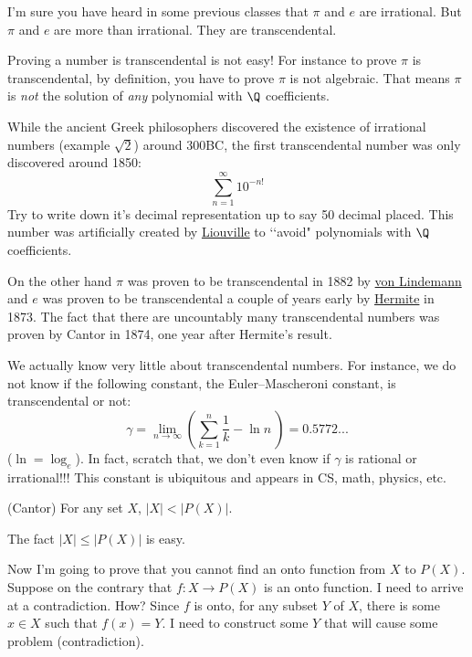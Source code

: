 I'm sure you have heard in some previous classes that $\pi$ and $e$
are irrational.
But $\pi$ and $e$ are more than irrational.
They are transcendental.

Proving a number is transcendental is not easy!
For instance to prove $\pi$ is transcendental, by definition,
you have to prove $\pi$ is not algebraic.
That means $\pi$ is \textit{not} the solution of \textit{any} polynomial
with $\Q$ coefficients.

While the ancient Greek philosophers discovered the existence of
irrational numbers (example $\sqrt{2}$) around 300BC,
the first transcendental number was only discovered around 1850:
\[
\sum_{n = 1}^\infty 10^{-n!}
\]
Try to write down it's decimal representation up to say 50 decimal placed.
This number was artificially created by
\href{https://en.wikipedia.org/wiki/Joseph_Liouville}{Liouville}
to \lq\lq avoid"
polynomials with $\Q$ coefficients.

On the other hand $\pi$ was proven to be transcendental in
1882 by
\href{https://en.wikipedia.org/wiki/Ferdinand_von_Lindemann}{von Lindemann}
and $e$ was proven to be transcendental a couple of years early by
\href{https://en.wikipedia.org/wiki/Charles_Hermite}{Hermite} in 1873.
The fact that there are uncountably many transcendental numbers
was proven by Cantor in 1874, one year after Hermite's result.

We actually know very little about transcendental numbers.
For instance, we do not know if the following constant,
the Euler–Mascheroni constant, is
transcendental or not:
\[
\gamma = \lim_{n \rightarrow \infty}
\left(
\sum_{k = 1}^n \frac{1}{k}
-
\ln n
\
\right)
= 0.5772...
\]
($\ln = \log_e$).
In fact, scratch that, we don't even know if $\gamma$ is rational or
irrational!!!
This constant is ubiquitous and appears in CS, math, physics, etc.








\begin{thm} \textnormal{(Cantor)}
For any set $X$, $|X| < |P(X)|$.
\end{thm}

The fact $|X| \leq |P(X)|$ is easy.

Now I'm going to prove that you cannot find an onto function
from $X$ to $P(X)$.
Suppose on the contrary that 
$f : X \rightarrow P(X)$ is an onto function.
I need to arrive at a contradiction.
How?
Since $f$ is onto,
for any subset $Y$ of $X$, there is some $x \in X$ such that
$f(x) = Y$.
I need to construct some $Y$ that will cause some problem (contradiction).

